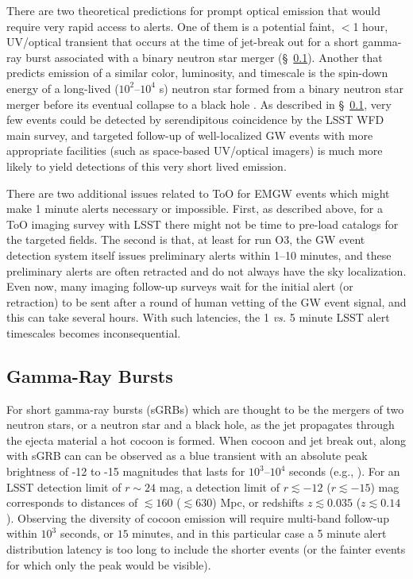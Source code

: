 \documentclass[DM,lsstdraft,authoryear,toc]{lsstdoc}
\begin{document}
There are two theoretical predictions for prompt optical emission that would require very rapid access to alerts. One of them is a potential faint, $<$1 hour, UV/optical transient that occurs at the time of jet-break out for a short gamma-ray burst associated with a binary neutron star merger (\S~\ref{ssec:latency_grb}). Another that predicts emission of a similar color, luminosity, and timescale is the spin-down energy of a long-lived ($10^2$--$10^4$ s) neutron star formed from a binary neutron star merger before its eventual collapse to a black hole \citep{2016ApJ...819...15S}. As described in \S~\ref{ssec:latency_grb}, very few events could be detected by serendipitous coincidence by the LSST WFD main survey, and targeted follow-up of well-localized GW events with more appropriate facilities (such as space-based UV/optical imagers) is much more likely to yield detections of this very short lived emission.

There are two additional issues related to ToO for EMGW events which might make 1 minute alerts necessary or impossible. First, as described above, for a ToO imaging survey with LSST there might not be time to pre-load catalogs for the targeted fields. The second is that, at least for run O3, the GW event detection system itself issues preliminary alerts within 1--10 minutes, and these preliminary alerts are often retracted and do not always have the sky localization. Even now, many imaging follow-up surveys wait for the initial alert (or retraction) to be sent after a round of human vetting of the GW event signal, and this can take several hours. With such latencies, the 1 {\it vs.} 5 minute LSST alert timescales becomes inconsequential. 



\subsection{Gamma-Ray Bursts}\label{ssec:latency_grb}

For short gamma-ray bursts (sGRBs) which are thought to be the mergers of two neutron stars, or a neutron star and a black hole, as the jet propagates through the ejecta material a hot cocoon is formed. When cocoon and jet break out, along with sGRB can can be observed as a blue transient with an absolute peak brightness of -12 to -15 magnitudes that lasts for $10^3$--$10^4$ seconds (e.g., \citealt{2018MNRAS.473..576G}). For an LSST detection limit of $r\sim24$ mag, a detection limit of $r\lesssim-12$ ($r\lesssim-15$) mag corresponds to distances of $\lesssim160$ ($\lesssim630$) Mpc, or redshifts $z\lesssim0.035$ ($z\lesssim0.14$). Observing the diversity of cocoon emission will require multi-band follow-up within $10^3$ seconds, or $15$ minutes, and in this particular case a 5 minute alert distribution latency is too long to include the shorter events (or the fainter events for which only the peak would be visible).
\end{document}
